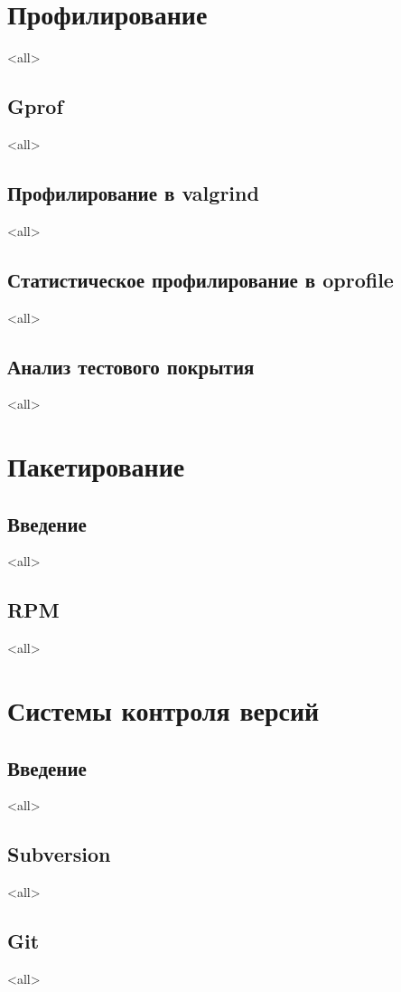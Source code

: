 \chapter{Профилирование}
\mode<all>{}
\section{Gprof}
\mode<all>{}
\section{Профилирование в valgrind}
\mode<all>{}
\section[oprofile]{Статистическое профилирование в oprofile}
\mode<all>{}
\section{Анализ тестового покрытия}
\mode<all>{}

\chapter{Пакетирование}
\section{Введение}
\mode<all>{}
\section{RPM}
\mode<all>{}

\chapter{Системы контроля версий}
\section{Введение}
\mode<all>{}
\section[SVN]{Subversion}
\mode<all>{}
\section{Git}
\mode<all>{}

